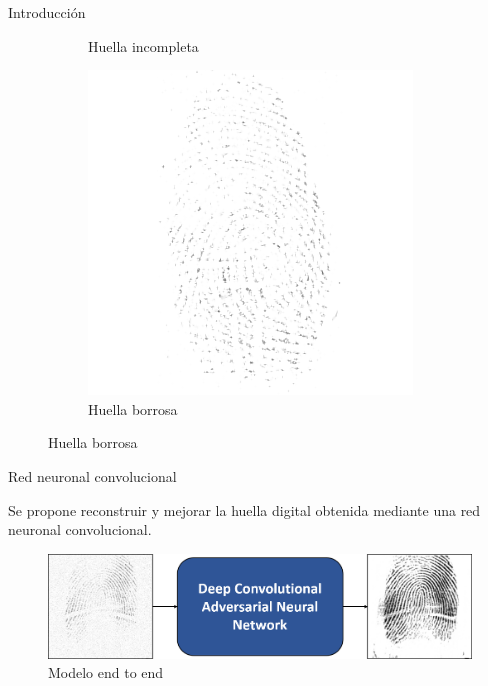 \documentclass[12pt,aspectratio=169]{beamer}
\begin{document}
\begin{frame}{Introducción}
\begin{figure}
\begin{subfigure}{0.23\textwidth}
            \caption{Huella incompleta}
        \end{subfigure}
        \begin{subfigure}{0.23\textwidth}
            \centering
            \includegraphics[scale=0.3]{figs/deteriorada_0.png}
            \caption{Huella borrosa}
        \end{subfigure}
    \end{figure}

\end{frame}

\begin{frame}{Red neuronal convolucional}

    Se propone reconstruir y mejorar la huella digital obtenida mediante una red neuronal convolucional.
    \vspace{5mm}

    \begin{figure}
            \includegraphics[scale=0.38]{figs/end_to_end.png}
            \caption{Modelo end to end}
    \end{figure}

\end{frame}
\end{document}
